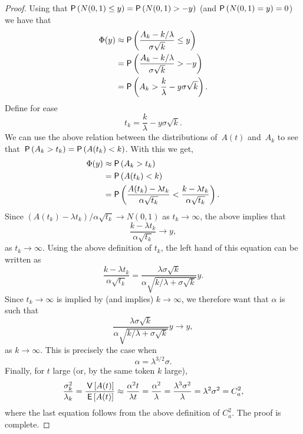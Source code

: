 \begin{proof}
Using that $\P{N(0,1) \leq y} =
\P{N(0,1) > -y}$ (and $\P{N(0,1)=y} = 0$) we have that
%
\begin{align*}
\Phi(y) &\approx \P{\frac{A_k - k/\lambda}{\sigma \sqrt k }\leq y} \\
        &= \P{\frac{A_k - k/\lambda}{\sigma \sqrt k} >  -y} \\
        &=  \P{A_k >  \frac k\lambda - y \sigma \sqrt k}.
\end{align*}
Define for ease
\begin{equation*}
t_k = \frac{k}\lambda - y \sigma \sqrt k.
\end{equation*}
We can use the above relation between the distributions of~$A(t)$
and~$A_k$ to see that~$\P{A_k >t_k } = \P{A(t_k) <k}$. With this we
get,
\begin{align*}
\Phi(y)
        &\approx  \P{A_k >  t_k } \\
        &=  \P{A(t_k) <  k } \\
        &=  \P{\frac{A(t_k) - \lambda t_k}{\alpha \sqrt{t_k}} < 
\frac{k-\lambda t_k}{\alpha \sqrt{t_k}}}.
\end{align*}
Since $(A(t_k) - \lambda t_k)/ \alpha \sqrt{t_k} \to N(0,1)$
as $t_k \to \infty$, the above implies that
\begin{equation*}
\frac{k-\lambda t_k}{\alpha \sqrt{t_k}} \to y,
\end{equation*}
as $t_k \to \infty$.  Using the above definition of $t_k$, the left
hand of this equation can be written as
\begin{equation*}
\frac{k-\lambda t_k}{\alpha \sqrt{t_k}} =
\frac{\lambda \sigma \sqrt k }{\alpha \sqrt{k/\lambda + \sigma\sqrt k}} y.
\end{equation*}
Since $t_k \to \infty$ is implied by (and implies)
$k\to\infty$, we therefore want that $\alpha$ is such that
\begin{equation*}
\frac{\lambda \sigma \sqrt k }{\alpha \sqrt{k/\lambda + \sigma\sqrt k}} y \to y,
\end{equation*}
as $k\to\infty$. This is precisely the case when
\begin{equation*}
\alpha = \lambda^{3/2}\sigma.
\end{equation*}
Finally, for $t$ large (or, by the same token $k$ large),
\begin{equation*}
\frac{\sigma_k^2}{\lambda_k} = \frac{\,\mathsf{V}\left[A(t)\right]}{\,\mathsf{E}\left[A(t)\right]} \approx \frac{\alpha^2 t}{\lambda t} 
= \frac{\alpha^2}{\lambda} = \frac{\lambda^3\sigma^2}{\lambda} = \lambda^2 \sigma^2 = C_a^2,
\end{equation*}
where the last equation follows from the above definition of $C_a^2$.  The proof is complete.
\end{proof}








